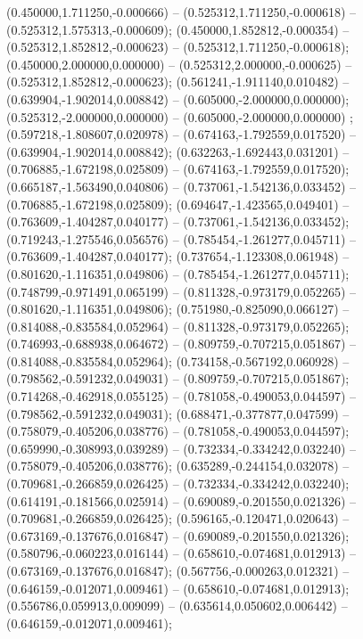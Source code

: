  (0.450000,1.711250,-0.000666) -- (0.525312,1.711250,-0.000618) -- (0.525312,1.575313,-0.000609);
 (0.450000,1.852812,-0.000354) -- (0.525312,1.852812,-0.000623) -- (0.525312,1.711250,-0.000618);
 (0.450000,2.000000,0.000000) -- (0.525312,2.000000,-0.000625) -- (0.525312,1.852812,-0.000623);
 (0.561241,-1.911140,0.010482) -- (0.639904,-1.902014,0.008842) -- (0.605000,-2.000000,0.000000);
 (0.525312,-2.000000,0.000000) -- (0.605000,-2.000000,0.000000) ;
 (0.597218,-1.808607,0.020978) -- (0.674163,-1.792559,0.017520) -- (0.639904,-1.902014,0.008842);
 (0.632263,-1.692443,0.031201) -- (0.706885,-1.672198,0.025809) -- (0.674163,-1.792559,0.017520);
 (0.665187,-1.563490,0.040806) -- (0.737061,-1.542136,0.033452) -- (0.706885,-1.672198,0.025809);
 (0.694647,-1.423565,0.049401) -- (0.763609,-1.404287,0.040177) -- (0.737061,-1.542136,0.033452);
 (0.719243,-1.275546,0.056576) -- (0.785454,-1.261277,0.045711) -- (0.763609,-1.404287,0.040177);
 (0.737654,-1.123308,0.061948) -- (0.801620,-1.116351,0.049806) -- (0.785454,-1.261277,0.045711);
 (0.748799,-0.971491,0.065199) -- (0.811328,-0.973179,0.052265) -- (0.801620,-1.116351,0.049806);
 (0.751980,-0.825090,0.066127) -- (0.814088,-0.835584,0.052964) -- (0.811328,-0.973179,0.052265);
 (0.746993,-0.688938,0.064672) -- (0.809759,-0.707215,0.051867) -- (0.814088,-0.835584,0.052964);
 (0.734158,-0.567192,0.060928) -- (0.798562,-0.591232,0.049031) -- (0.809759,-0.707215,0.051867);
 (0.714268,-0.462918,0.055125) -- (0.781058,-0.490053,0.044597) -- (0.798562,-0.591232,0.049031);
 (0.688471,-0.377877,0.047599) -- (0.758079,-0.405206,0.038776) -- (0.781058,-0.490053,0.044597);
 (0.659990,-0.308993,0.039289) -- (0.732334,-0.334242,0.032240) -- (0.758079,-0.405206,0.038776);
 (0.635289,-0.244154,0.032078) -- (0.709681,-0.266859,0.026425) -- (0.732334,-0.334242,0.032240);
 (0.614191,-0.181566,0.025914) -- (0.690089,-0.201550,0.021326) -- (0.709681,-0.266859,0.026425);
 (0.596165,-0.120471,0.020643) -- (0.673169,-0.137676,0.016847) -- (0.690089,-0.201550,0.021326);
 (0.580796,-0.060223,0.016144) -- (0.658610,-0.074681,0.012913) -- (0.673169,-0.137676,0.016847);
 (0.567756,-0.000263,0.012321) -- (0.646159,-0.012071,0.009461) -- (0.658610,-0.074681,0.012913);
 (0.556786,0.059913,0.009099) -- (0.635614,0.050602,0.006442) -- (0.646159,-0.012071,0.009461);
